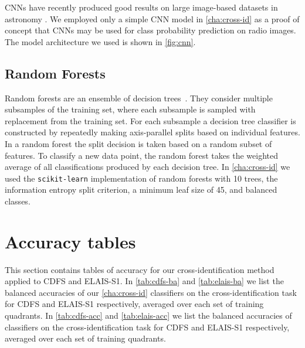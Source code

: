     CNNs have recently produced good results on large image-based datasets in
    astronomy \citep[e.g.]{lukic18compact, dieleman15cnn}. We employed
    only a simple CNN model in \autoref{cha:cross-id} as a proof of concept that CNNs may
    be used for class probability prediction on radio images. The model
    architecture we used is shown in \autoref{fig:cnn}.

  \subsection{Random Forests}
  \label{sec:atlas-random-forests}

    Random forests are an ensemble of decision
    trees~\citep{breiman01random-forest}. They consider multiple subsamples of
    the training set, where each subsample is sampled with replacement from
    the training set. For each subsample a decision tree classifier is
    constructed by repeatedly making axis-parallel splits based on individual
    features. In a random forest the split decision is taken based on a random
    subset of features. To classify a new data point, the random forest takes
    the weighted average of all classifications produced by each decision
    tree. {In \autoref{cha:cross-id} we used the \texttt{scikit-learn} \citep{pedregosa11sklearn}
    implementation of random forests with 10 trees, the information entropy
    split criterion, a minimum leaf size of 45, and balanced classes}.

\section{Accuracy tables}\label{sec:atlas-xid-accuracies}
  
  This section contains tables of accuracy for our cross-identification method applied to CDFS and
  ELAIS-S1. In \autoref{tab:cdfs-ba} and \autoref{tab:elais-ba} we list the
  balanced accuracies of our \autoref{cha:cross-id} classifiers on the cross-identification task for CDFS
  and ELAIS-S1 respectively, averaged over each set of training quadrants. In
  \autoref{tab:cdfs-acc} and \autoref{tab:elais-acc} we list the balanced
  accuracies of classifiers on the cross-identification task for CDFS and
  ELAIS-S1 respectively, averaged over each set of training quadrants.

